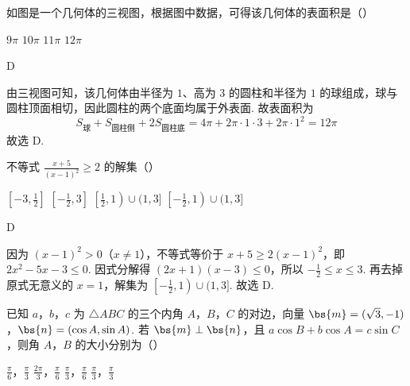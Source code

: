 \begin{problem}
如图是一个几何体的三视图，根据图中数据，可得该几何体的表面积是（\quad）


\choices
    {\(9\pi\)}
    {\(10\pi\)}
    {\(11\pi\)}
    {\(12\pi\)}
\end{problem}

\begin{answer}
D
\end{answer}

\begin{solution}
由三视图可知，该几何体由半径为 \(1\)、高为 \(3\) 的圆柱和半径为 \(1\) 的球组成，球与圆柱顶面相切，因此圆柱的两个底面均属于外表面. 故表面积为
\[
S_{\text{球}}+S_{\text{圆柱侧}}+2S_{\text{圆柱底}}
 =4\pi+2\pi\cdot1\cdot3+2\pi\cdot1^2
 =12\pi
\] 故选 D.
\end{solution}

\begin{problem}
不等式 \(\frac{x + 5}{(x - 1)^2} \geqslant 2\) 的解集（\quad）

\choices
    {\(\left[-3, \frac{1}{2}\right]\)}
    {\(\left[-\frac{1}{2}, 3\right]\)}
    {\(\left[\frac{1}{2}, 1\right) \cup (1, 3]\)}
    {\(\left[-\frac{1}{2}, 1\right) \cup (1, 3]\)}
\end{problem}

\begin{answer}
D
\end{answer}

\begin{solution}
因为 \((x-1)^2>0\)（\(x\neq1\)），不等式等价于 \(x+5\geqslant2(x-1)^2\)，即 \(2x^2-5x-3\leqslant0\). 因式分解得 \((2x+1)(x-3)\leqslant0\)，所以 \(-\frac12\leqslant x\leqslant3\). 再去掉原式无意义的 \(x=1\)，解集为 \(\left[-\frac12,1\right)\cup(1,3]\).
故选 D.
\end{solution}

\begin{problem}
已知 \(a\)，\(b\)，\(c\) 为 \(\triangle ABC\) 的三个内角 \(A\)，\(B\)，\(C\) 的对边，向量 \(\bs{m} = (\sqrt{3}, -1)\)，\(\bs{n} = (\cos A, \sin A)\). 若 \(\bs{m} \perp \bs{n}\)，且 \(a \cos B + b \cos A = c \sin C\)，则角 \(A\)，\(B\) 的大小分别为（\quad）

\choices
    {\(\frac{\pi}{6}\)，\(\frac{\pi}{3}\)}
    {\(\frac{2\pi}{3}\)，\(\frac{\pi}{6}\)}
    {\(\frac{\pi}{3}\)，\(\frac{\pi}{6}\)}
    {\(\frac{\pi}{3}\)，\(\frac{\pi}{3}\)}
\end{problem}

